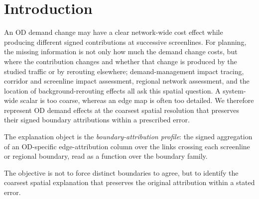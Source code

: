 \documentclass[a4paper,fleqn]{cas-sc}
\begin{document}
\section{Introduction}\label{sec:intro}
An OD demand change may have a clear network-wide cost effect while
producing different signed contributions at successive screenlines. For
planning, the missing information is not only how much the demand change
costs, but where the contribution changes and whether that change is
produced by the studied traffic or by rerouting elsewhere; demand-management
impact tracing, corridor and screenline impact assessment, regional network
assessment, and the location of background-rerouting effects all ask this
spatial question. A system-wide scalar is too coarse, whereas an edge map
is often too detailed. We therefore represent OD demand effects at the
coarsest spatial resolution that preserves their signed boundary
attributions within a prescribed error.

The explanation object is the \emph{boundary-attribution profile}: the
signed aggregation of an OD-specific edge-attribution column over the
links crossing each screenline or regional boundary, read as a function
over the boundary family.

\medskip
\noindent{}
\medskip

\noindent The objective is not to force distinct boundaries to agree,
but to identify the coarsest spatial explanation that preserves the
original attribution within a stated error.
\end{document}
